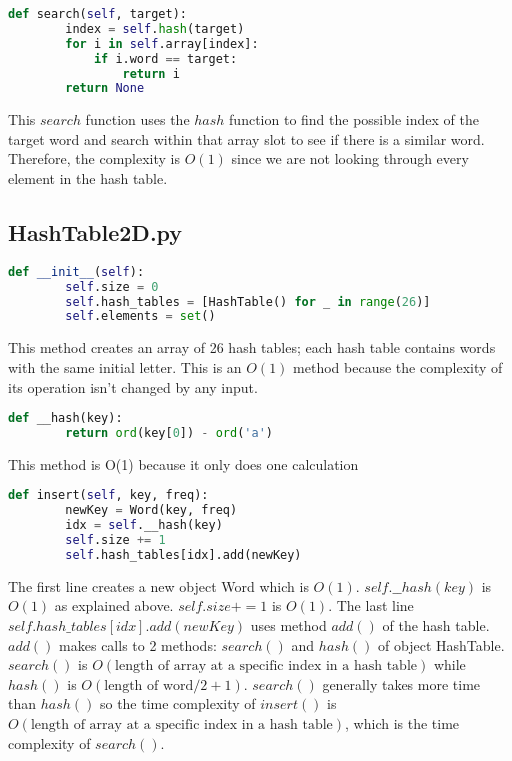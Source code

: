 \documentclass[10pt]{article}
\theoremstyle{definition}
\begin{document}
\begin{lstlisting}[language=Python, basicstyle=\small]
    def search(self, target):
        index = self.hash(target)
        for i in self.array[index]:
            if i.word == target:
                return i
        return None
\end{lstlisting}
This $search$ function uses the $hash$ function to find the possible index of the target word and search within that array slot to see if there is a similar word. Therefore, the complexity is $O(1)$ since we are not looking through every element in the hash table.


\subsection{HashTable2D.py}

\begin{lstlisting}[language=Python, basicstyle=\small]
    def __init__(self):
        self.size = 0
        self.hash_tables = [HashTable() for _ in range(26)]
        self.elements = set()
\end{lstlisting}
This method creates an array of 26 hash tables; each hash table contains words with the same initial letter. This is an $O(1)$ method because the complexity of its operation isn't changed by any input.

\begin{lstlisting}[language=Python, basicstyle=\small]
    def __hash(key):
        return ord(key[0]) - ord('a')
\end{lstlisting}
This method is O(1) because it only does one calculation

\begin{lstlisting}[language=Python, basicstyle=\small]
    def insert(self, key, freq):
        newKey = Word(key, freq)
        idx = self.__hash(key)
        self.size += 1
        self.hash_tables[idx].add(newKey)
\end{lstlisting}
The first line creates a new object Word which is $O(1)$. $self.\_\_hash(key)$ is $O(1)$ as explained above. $self.size += 1$ is $O(1)$. The last line $self.hash\_tables[idx].add(newKey)$ uses method $add()$ of the hash table. $add()$ makes calls to 2 methods: $search()$ and $hash()$ of object HashTable. $search()$ is $O(\text{length of array at a specific index in a hash table})$ while $hash()$ is $O(\text{length of word}/ 2 + 1)$. $search()$ generally takes more time than $hash()$ so the time complexity of $insert()$ is $O(\text{length of array at a specific index in a hash table})$, which is the time complexity of $search()$.
\end{document}
